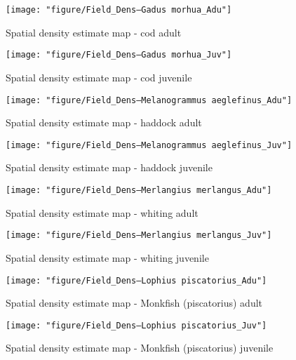 \documentclass[11pt]{article}
\begin{document}
\begin{landscape}

\begin{figure}[!phtb]
	\centering
\texttt{[image: "figure/Field\_Dens--Gadus morhua\_Adu"]}
\caption{Spatial density estimate map - cod adult}
\label{fig:15}
\end{figure}


\begin{figure}[!phtb]
	\centering
\texttt{[image: "figure/Field\_Dens--Gadus morhua\_Juv"]}
\caption{Spatial density estimate map - cod juvenile}
\label{fig:16}
\end{figure}

\begin{figure}[!phtb]
	\centering
\texttt{[image: "figure/Field\_Dens--Melanogrammus aeglefinus\_Adu"]}
\caption{Spatial density estimate map - haddock adult}
\label{fig:17}
\end{figure}


\begin{figure}[!phtb]
	\centering
\texttt{[image: "figure/Field\_Dens--Melanogrammus aeglefinus\_Juv"]}
\caption{Spatial density estimate map - haddock juvenile}
\label{fig:18}
\end{figure}

\begin{figure}[!phtb]
	\centering
\texttt{[image: "figure/Field\_Dens--Merlangius merlangus\_Adu"]}
\caption{Spatial density estimate map - whiting adult}
\label{fig:19}
\end{figure}

\begin{figure}[!phtb]
	\centering
\texttt{[image: "figure/Field\_Dens--Merlangius merlangus\_Juv"]}
\caption{Spatial density estimate map - whiting juvenile}
\label{fig:20}
\end{figure}

\begin{figure}[!phtb]
	\centering
\texttt{[image: "figure/Field\_Dens--Lophius piscatorius\_Adu"]}
\caption{Spatial density estimate map - Monkfish (piscatorius) adult}
\label{fig:21}
\end{figure}

\begin{figure}[!phtb]
	\centering
\texttt{[image: "figure/Field\_Dens--Lophius piscatorius\_Juv"]}
\caption{Spatial density estimate map - Monkfish (piscatorius) juvenile}
\label{fig:22}
\end{figure}


\end{landscape}
\end{document}

